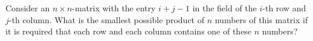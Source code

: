 Consider an $n\times n$-matrix with the entry $i+j-1$ in the field of the $i$-th row and $j$-th column. 
What is the smallest possible product of $n$ numbers of this matrix if it is required that 
each row and each column contains one of these $n$ numbers?